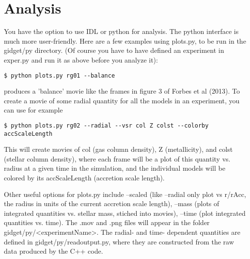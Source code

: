 \documentclass[11pt]{amsart}
\begin{document}
\section{Analysis}
You have the option to use IDL or python for analysis. The python interface is much more user-friendly. Here are a few examples using plots.py, to be run in the gidget/py directory. (Of course you have to have defined an experiment in exper.py and run it as above before you analyze it):
\begin{verbatim}
$ python plots.py rg01 --balance
\end{verbatim}
produces a 'balance' movie like the frames in figure 3 of Forbes et al (2013). To create a movie of some radial quantity for all the models in an experiment, you can use for example
\begin{verbatim}
$ python plots.py rg02 --radial --vsr col Z colst --colorby accScaleLength
\end{verbatim}
This will create movies of col (gas column density), Z (metallicity), and colst (stellar column density), where each frame will be a plot of this quantity vs. radius at a given time in the simulation, and the individual models will be colored by its accScaleLength (accretion scale length).

Other useful options for plots.py include --scaled (like --radial only plot vs r/rAcc, the radius in units of the current accretion scale length), --mass (plots of integrated quantities vs. stellar mass, stiched into movies), --time (plot integrated quantities vs. time). The .mov and .png files will appear in the folder gidget/py/<experimentName>. The radial- and time- dependent quantities are defined in gidget/py/readoutput.py, where they are constructed from the raw data produced by the C++ code.
\end{document}
